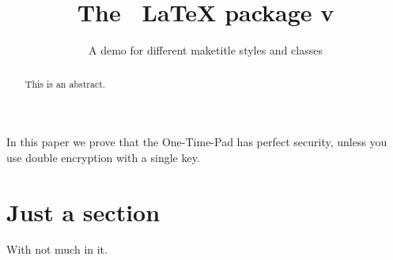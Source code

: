 \documentclass[]{spie}
\title[plaintext={The metacapture LaTeX package},
       running={The \pkgname\ \LaTeX\ package v\pkgversion},
      ]{The \pkgname\ \textrm{\LaTeX} package v\pkgversion}%
\subtitle{A demo for different maketitle styles and classes}
\begin{document}
\maketitle

\begin{abstract}
  This is an abstract.
\end{abstract}
\begin{textabstract}
In this paper we prove that the One-Time-Pad has perfect security, unless you use
double encryption with a single key.
\end{textabstract}
\section{Just a section}
With not much in it.
\end{document}
